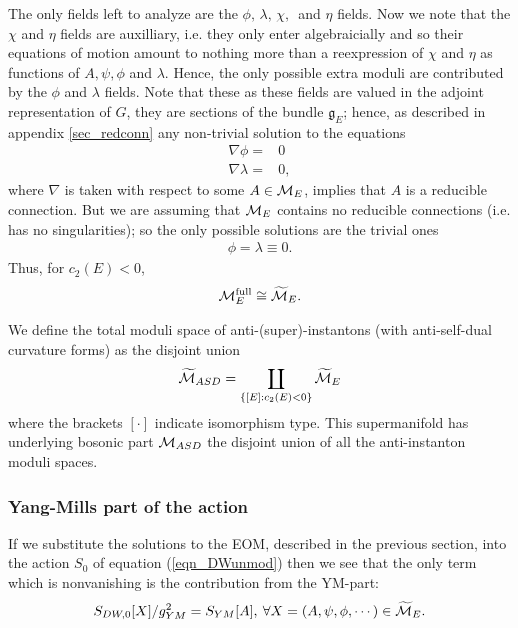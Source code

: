 \documentclass[12pt, onecolumn]{article}
\newenvironment{definition}[1][Definition]{\begin{trivlist}
\item[\hskip \labelsep {\bfseries #1}]}{\end{trivlist}}
\begin{document}
\noindent The only fields left to analyze are the $\phi,\,\lambda,\,\chi,\,$ and $\eta$ fields.  Now we note that the $\chi$ and $\eta$ fields are auxilliary, i.e. they only enter algebraicially and so their equations of motion amount to nothing more than a reexpression of $\chi$ and $\eta$ as functions of $A,\psi,\phi$ and $\lambda$.  Hence, the only possible extra moduli are contributed by the $\phi$ and $\lambda$ fields.  Note that these as these fields are valued in the adjoint representation of $G$, they are sections of the bundle $\mathfrak{g}_{E}$; hence, as described in appendix \ref{sec_redconn} any non-trivial solution to the equations
\begin{align*}
\nabla \phi =&0\\
\nabla \lambda =&0,
\end{align*}
where $\nabla$ is taken with respect to some $A \in {\cal M}_{E}$, implies that $A$ is a reducible connection.  But we are assuming that ${\cal M}_{E}$ contains no reducible connections (i.e. has no singularities); so the only possible solutions are the trivial ones
\begin{align*}
\phi = \lambda \equiv 0.
\end{align*}
Thus, for $c_{2}(E)<0$,
\begin{align*}
{\cal M}^{\text{full}}_{E} \cong \widetilde{{\cal M}}_{E}.
\end{align*}

\begin{definition}
We define the total moduli space of anti-(super)-instantons (with anti-self-dual curvature forms) as the disjoint union
\begin{align*}
\widetilde{{\cal M}}_{ASD}=\coprod_{\left\{[E]:c_{2}(E)<0\right\}}\widetilde{{\cal M}}_{E}
\end{align*}
where the brackets $[\cdot]$ indicate isomorphism type.  This supermanifold has underlying bosonic part ${\cal M}_{ASD}$ the disjoint union of all the anti-instanton moduli spaces.
\end{definition}

\subsubsection{Yang-Mills part of the action}
If we substitute the solutions to the EOM, described in the previous section, into the action $S_{0}$ of equation (\ref{eqn_DWunmod}) then we see that the only term which is nonvanishing is the contribution from the YM-part:
\begin{align*}
S_{DW,0}[X]/g_{YM}^2=S_{YM}[A], \: \forall X=(A,\psi,\phi,\cdots) \in \widetilde{{\cal M}}_{E}.
\end{align*}
\end{document}

